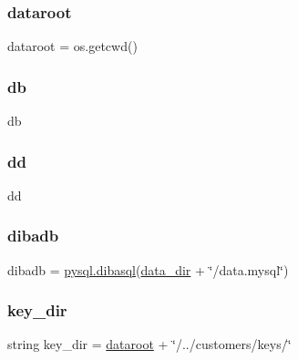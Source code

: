 \subsubsection{\texorpdfstring{dataroot}{dataroot}}
{\footnotesize\ttfamily dataroot = os.\+getcwd()}

\mbox{\label{namespacedibagui_a89a7f6028a19c3dc081cc5f16eb53891}} 
\subsubsection{\texorpdfstring{db}{db}}
{\footnotesize\ttfamily db}

\mbox{\label{namespacedibagui_a11ddbaf3386aea1f2974eee984542152}} 
\subsubsection{\texorpdfstring{dd}{dd}}
{\footnotesize\ttfamily dd}

\mbox{\label{namespacedibagui_aea382d5bc10635f82287dcc5486e4ed1}} 
\subsubsection{\texorpdfstring{dibadb}{dibadb}}
{\footnotesize\ttfamily dibadb = \hyperlink{classpysql_1_1dibasql}{pysql.\+dibasql}(\hyperlink{namespacedibagui_a5437a7caa57bba3f6e4d82d92bafd787}{data\+\_\+dir} + \char`\"{}/data.\+mysql\char`\"{})}

\mbox{\label{namespacedibagui_ad29c08ef121cb6e69df9433aa5b101d7}} 
\subsubsection{\texorpdfstring{key\+\_\+dir}{key\_dir}}
{\footnotesize\ttfamily string key\+\_\+dir = \hyperlink{namespacedibagui_a5cdafc01cb2d85e5af4a95537b9713de}{dataroot} + \char`\"{}/../customers/keys/\char`\"{}}

\mbox{\label{namespacedibagui_a782c1a3f26f508cb307533b6bde86508}} 
